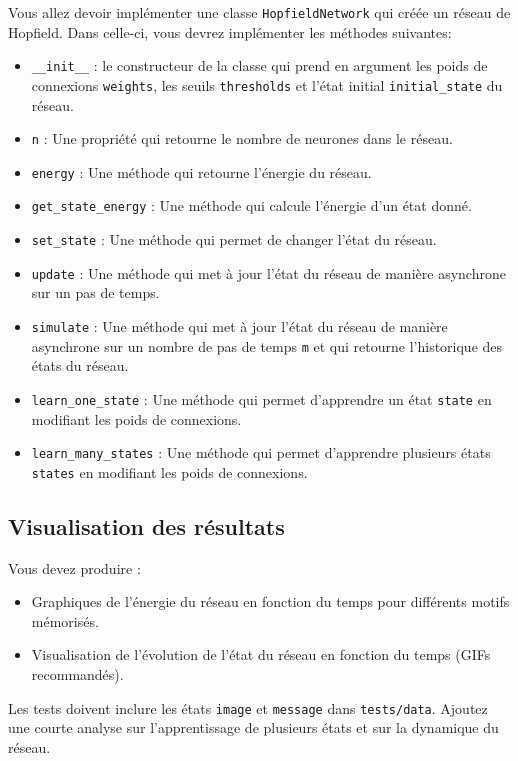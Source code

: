 \documentclass[12pt, letterpaper]{article}
\begin{document}
\noindent Vous allez devoir implémenter une classe \texttt{HopfieldNetwork} qui créée un réseau de Hopfield.
Dans celle-ci, vous devrez implémenter les méthodes suivantes:
\begin{itemize}
	\item \texttt{\_\_init\_\_} : le constructeur de la classe qui prend en argument les poids de connexions
	      \texttt{weights}, les seuils \texttt{thresholds} et l'état initial \texttt{initial\_state} du réseau.
	\item \texttt{n} : Une propriété qui retourne le nombre de neurones dans le réseau.
	\item \texttt{energy} : Une méthode qui retourne l'énergie du réseau.
	\item \texttt{get\_state\_energy} : Une méthode qui calcule l'énergie d'un état donné.
	\item \texttt{set\_state} : Une méthode qui permet de changer l'état du réseau.
	\item \texttt{update} : Une méthode qui met à jour l'état du réseau de manière asynchrone sur un pas de temps.
	\item \texttt{simulate} : Une méthode qui met à jour l'état du réseau de manière asynchrone sur un nombre de
	      pas de temps \texttt{m} et qui retourne l'historique des états du réseau.
	\item \texttt{learn\_one\_state} : Une méthode qui permet d'apprendre un état \texttt{state} en modifiant les
	      poids de connexions.
	\item \texttt{learn\_many\_states} : Une méthode qui permet d'apprendre plusieurs états \texttt{states} en modifiant les
	      poids de connexions.
\end{itemize}

\subsection{Visualisation des résultats}\label{subsec:visualisation}

\noindent Vous devez produire :
\begin{itemize}
	\item Graphiques de l’énergie du réseau en fonction du temps pour différents motifs mémorisés.
	\item Visualisation de l’évolution de l’état du réseau en fonction du temps (GIFs recommandés).
\end{itemize}

\noindent Les tests doivent inclure les états \texttt{image} et \texttt{message} dans \texttt{tests/data}. Ajoutez une courte analyse sur l’apprentissage de plusieurs états et sur la dynamique du réseau.
\end{document}
